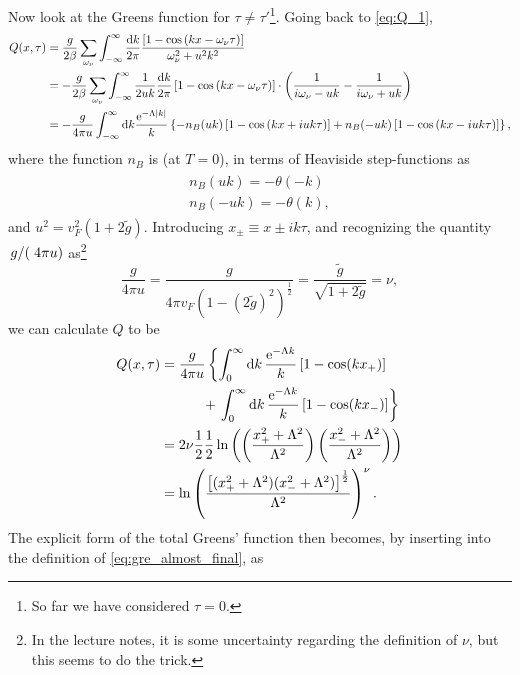 Now look at the Greens function for \(\tau \ne\tau'\)\footnote{So far we have considered \(\tau=0\).}. Going back to \eqref{eq:Q_1}, 
\begin{align*}
Q(x, \tau) &= \frac{g}{2\beta}\sum_{\omega_\nu}\int_{-\infty}^\infty\frac{\dd{k}}{2\pi}\frac{\left[1-\cos\left(kx-\omega_\nu\tau\right)\right]}{\omega_\nu^2+u^2k^2} \\
&= -\frac{g}{2\beta}\sum_{\omega_\nu}\int_{-\infty}^\infty\frac{1}{2uk}\frac{\dd{k}}{2\pi}\left[1-\cos\left(kx-\omega_\nu\tau\right)\right]%
\cdot \left(\frac{1}{i\omega_\nu -uk} - \frac{1}{i\omega_\nu+uk}\right) \\
&= -\frac{g}{4\pi u}\int_{-\infty}^\infty\dd k\frac{\e^{-\Lambda |k|}}{k}\left\{-n_B(uk)\left[1-\cos\left(kx+iuk\tau\right)\right] +n_B(-uk)\left[1-\cos\left(kx-iuk\tau\right)\right] \right\},
\end{align*}
where the function $n_B$ is (at $T=0$), in terms of Heaviside step-functions as
\begin{align}
\begin{split}
n_B(uk) = -\theta(-k)\\
n_B(-uk) = -\theta(k),
\end{split}
\end{align}
and \(u^2=v_F^2(1+2\tilde{g})\).
Introducing \(x_\pm\equiv x\pm ik\tau\), and recognizing the quantity \(\flatfrac{g}(4\pi u)\) as\footnote{In the lecture notes, it is some uncertainty regarding the definition of \(\nu\), but this seems to do the trick.}
\begin{equation*}
\frac{g}{4\pi u} = \frac{g}{4\pi v_F(1-(2\tilde{g})^2)^{\frac{1}{2}}} =\frac{\tilde{g}}{\sqrt{1+2\tilde{g}}}  = \nu,
\end{equation*}
we can calculate \(Q\) to be
\begin{align*}
	Q(x, \tau) &=\frac{g}{4\pi u}\left\{\int_0^\infty\dd {k}\frac{\mathrm{e}^{-\Lambda k}}{k}\left[1-\cos(kx_+)\right] \right. \\
	&\qquad\quad + \left.\int_0^\infty \dd{k}\frac{\mathrm{e}^{-\Lambda k}}{k}\left[1-\cos(kx_-)\right]
	\right\} \\
	&= 2\nu\frac12\frac12\ln\left(\left(\frac{x_+^2+\Lambda^2}{\Lambda^2}\right)\left(\frac{x_-^2+\Lambda^2}{\Lambda^2}\right)\right) \\
	&=\ln\left(\frac{\left[(x_+^2+\Lambda^2)(x_-^2+\Lambda^2)\right]^{\frac12}}{\Lambda^2}\right)^\nu.
\end{align*}
The explicit form of the total Greens' function then becomes, by inserting into the definition of \cref{eq:gre_almost_final}, as

